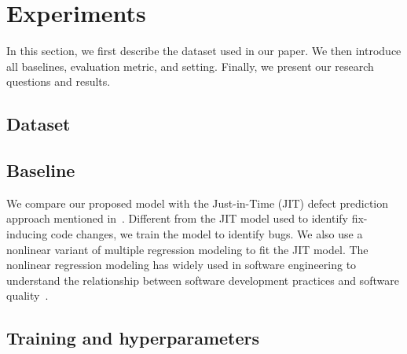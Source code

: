 \section{Experiments}
\label{sec:exp}
In this section, we first describe the dataset used in our paper. We then introduce all baselines, evaluation metric, and setting. Finally, we present our research questions and results.

\subsection{Dataset}
\label{sec:dataset}

\subsection{Baseline}
\label{sec:baseline}

We compare our proposed model with the Just-in-Time (JIT) defect prediction approach mentioned in~\cite{mcintosh2018fix}. Different from the JIT model used to identify fix-inducing code changes, we train the model to identify bugs. We also use a nonlinear variant of multiple regression modeling to fit the JIT model. The nonlinear regression modeling has widely used in software engineering to understand the relationship between software development practices and software quality~\cite{zhou2011does, morales2015code, mcintosh2016empirical}. 

\subsection{Training and hyperparameters}
\label{sec:training_parameters}



